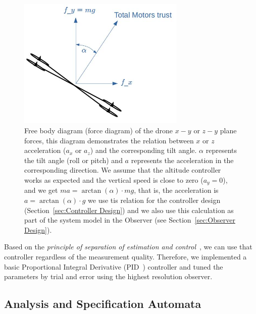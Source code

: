 \documentclass[ twoside, 12pt ]{article}
\begin{document}
\begin{figure} %
    \centerline{\includegraphics[width=80mm]{acceleration_static_diagram.jpg}}
    \caption{Free body diagram (force diagram) of the drone $x-y$ or $z-y$ plane forces, this diagram demonstrates the relation between $x$ or $z$ acceleration ($a_x$ or $a_z$) and the corresponding tilt angle. $\alpha$ represents the tilt angle (roll or pitch) and $a$ represents the acceleration in the corresponding direction. We assume that the altitude controller works as expected and the vertical speed is close to zero ($a_y = 0$), and we get $m a = \arctan(\alpha) \cdot mg$, that is, the acceleration is $a = \arctan(\alpha) \cdot g$ we use tis relation for the controller design (Section~\ref{sec:Controller Design}) and we also use this calculation as part of the system model in the Observer (see Section~\ref{sec:Observer Design}). }
    \label{fig:acceleration_static_diagram}
\end{figure}

Based on the \textit{principle of separation of estimation and control}~\cite{aastrom2012introduction}, we can use that controller regardless of the measurement quality. Therefore, we implemented a basic Proportional Integral Derivative (PID~\cite{aastrom2006advanced}) controller and tuned the parameters by trial and error using the highest resolution observer.

\subsection{Analysis and Specification Automata}
\label{sec:Analysis}
\end{document}
